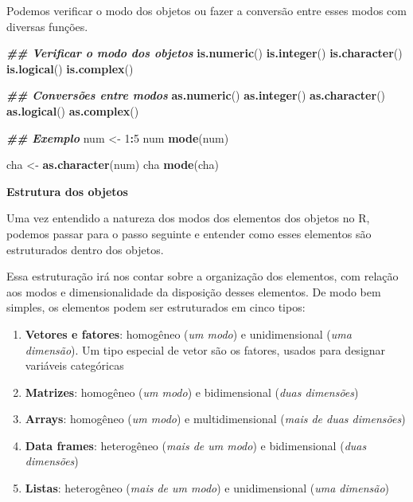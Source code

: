 \documentclass[
]{article}
\newenvironment{Shaded}{\begin{snugshade}}{\end{snugshade}}
\newcommand{\DecValTok}[1]{\textcolor[rgb]{0.00,0.00,0.81}{#1}}
\newcommand{\DocumentationTok}[1]{\textcolor[rgb]{0.56,0.35,0.01}{\textbf{\textit{#1}}}}
\newcommand{\FunctionTok}[1]{\textcolor[rgb]{0.13,0.29,0.53}{\textbf{#1}}}
\newcommand{\NormalTok}[1]{#1}
\newcommand{\OtherTok}[1]{\textcolor[rgb]{0.56,0.35,0.01}{#1}}
\newcommand{\SpecialCharTok}[1]{\textcolor[rgb]{0.81,0.36,0.00}{\textbf{#1}}}
\providecommand{\tightlist}{%
  \setlength{\itemsep}{0pt}\setlength{\parskip}{0pt}}
\begin{document}
Podemos verificar o modo dos objetos ou fazer a conversão entre esses modos com diversas funções.

\begin{Shaded}
\begin{Highlighting}[]
\DocumentationTok{\#\# Verificar o modo dos objetos}
\FunctionTok{is.numeric}\NormalTok{()}
\FunctionTok{is.integer}\NormalTok{()}
\FunctionTok{is.character}\NormalTok{()}
\FunctionTok{is.logical}\NormalTok{()}
\FunctionTok{is.complex}\NormalTok{()}

\DocumentationTok{\#\# Conversões entre modos}
\FunctionTok{as.numeric}\NormalTok{()}
\FunctionTok{as.integer}\NormalTok{()}
\FunctionTok{as.character}\NormalTok{()}
\FunctionTok{as.logical}\NormalTok{()}
\FunctionTok{as.complex}\NormalTok{()}

\DocumentationTok{\#\# Exemplo}
\NormalTok{num }\OtherTok{\textless{}{-}} \DecValTok{1}\SpecialCharTok{:}\DecValTok{5}
\NormalTok{num}
\FunctionTok{mode}\NormalTok{(num)}

\NormalTok{cha }\OtherTok{\textless{}{-}} \FunctionTok{as.character}\NormalTok{(num)}
\NormalTok{cha}
\FunctionTok{mode}\NormalTok{(cha)}
\end{Highlighting}
\end{Shaded}

\textbf{Estrutura dos objetos}

Uma vez entendido a natureza dos modos dos elementos dos objetos no R, podemos passar para o passo seguinte e entender como esses elementos são estruturados dentro dos objetos.

Essa estruturação irá nos contar sobre a organização dos elementos, com relação aos modos e dimensionalidade da disposição desses elementos. De modo bem simples, os elementos podem ser estruturados em cinco tipos:

\begin{enumerate}
\def\labelenumi{\arabic{enumi}.}
\tightlist
\item
  \textbf{Vetores e fatores}: homogêneo (\emph{um modo}) e unidimensional (\emph{uma dimensão}). Um tipo especial de vetor são os fatores, usados para designar variáveis categóricas
\item
  \textbf{Matrizes}: homogêneo (\emph{um modo}) e bidimensional (\emph{duas dimensões})
\item
  \textbf{Arrays}: homogêneo (\emph{um modo}) e multidimensional (\emph{mais de duas dimensões})
\item
  \textbf{Data frames}: heterogêneo (\emph{mais de um modo}) e bidimensional (\emph{duas dimensões})
\item
  \textbf{Listas}: heterogêneo (\emph{mais de um modo}) e unidimensional (\emph{uma dimensão})
\end{enumerate}
\end{document}
